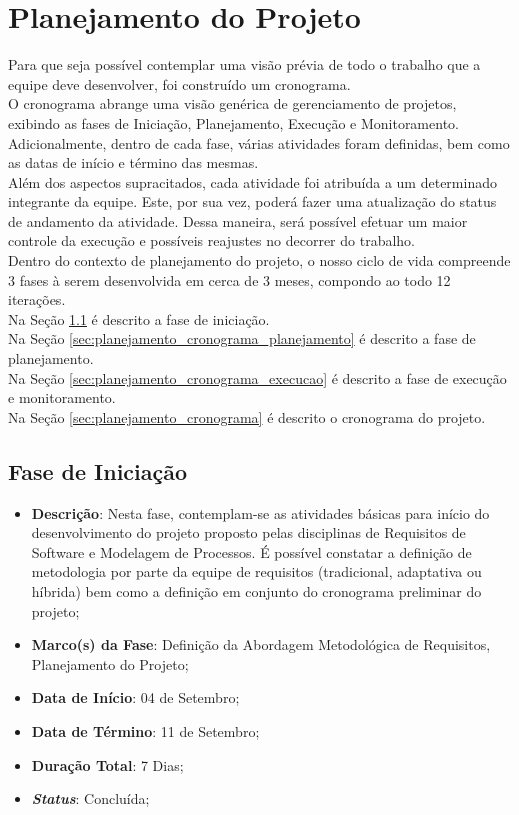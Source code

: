 \chapter[Planejamento do Projeto]{Planejamento do Projeto}
\label{chap:planejamento}
	Para que seja possível contemplar uma visão prévia de todo o trabalho que a equipe deve desenvolver, foi construído um cronograma.
	\\ \indent O cronograma abrange uma visão genérica de gerenciamento de projetos, exibindo as fases de Iniciação, Planejamento, Execução e Monitoramento. Adicionalmente, dentro de cada fase, várias atividades foram definidas, bem como as datas de início e término das mesmas.
	\\ \indent Além dos aspectos supracitados, cada atividade foi atribuída a um determinado integrante da equipe. Este, por sua vez, poderá fazer uma atualização do status de andamento da atividade. Dessa maneira, será possível efetuar um maior controle da execução e possíveis reajustes no decorrer do trabalho.
	\\ \indent Dentro do contexto de planejamento do projeto, o nosso ciclo de vida compreende 3 fases à serem desenvolvida em cerca de 3 meses, compondo ao todo 12 iterações.
	\\ \indent Na Seção \ref{sec:planejamento_cronograma_iniciacao} é descrito a fase de iniciação. 
	\\ \indent Na Seção \ref{sec:planejamento_cronograma_planejamento} é descrito a fase de planejamento.
	\\ \indent Na Seção \ref{sec:planejamento_cronograma_execucao} é descrito a fase de execução e monitoramento.
	\\ \indent Na Seção \ref{sec:planejamento_cronograma} é descrito o cronograma do projeto.


	\section[Fase de Iniciação]{Fase de Iniciação}
	\label{sec:planejamento_cronograma_iniciacao}
		\begin{itemize}
			\item{\textbf{Descrição}: Nesta fase, contemplam-se as atividades básicas para início do desenvolvimento do projeto proposto pelas disciplinas de Requisitos de Software e Modelagem de Processos. É possível constatar a definição de metodologia por parte da equipe de requisitos (tradicional, adaptativa ou híbrida) bem como a definição em conjunto do cronograma preliminar do projeto;}
			\item{\textbf{Marco(s) da Fase}: Definição da Abordagem Metodológica de Requisitos, Planejamento do Projeto;}
			\item{\textbf{Data de Início}: 04 de Setembro;}
			\item{\textbf{Data de Término}: 11 de Setembro;}
			\item{\textbf{Duração Total}: 7 Dias;}
			\item{\textbf{\emph{Status}}: Concluída;}
		\end{itemize}
			


